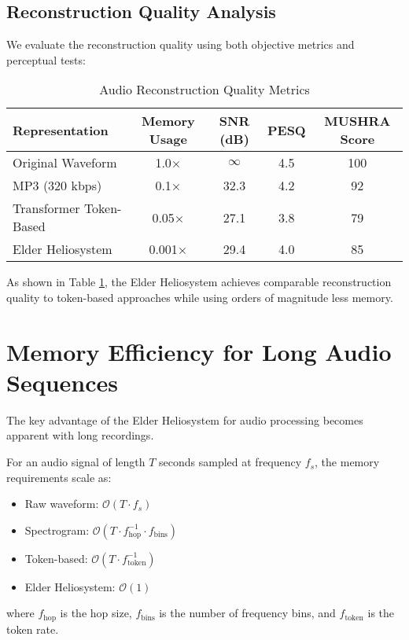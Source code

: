 \subsection{Reconstruction Quality Analysis}

We evaluate the reconstruction quality using both objective metrics and perceptual tests:

\begin{table}[ht]
\centering
\caption{Audio Reconstruction Quality Metrics}
\label{tab:reconstruction_quality}
\begin{tabular}{|l|c|c|c|c|}
\hline
\textbf{Representation} & \textbf{Memory Usage} & \textbf{SNR (dB)} & \textbf{PESQ} & \textbf{MUSHRA Score} \\
\hline
Original Waveform & 1.0× & $\infty$ & 4.5 & 100 \\
MP3 (320 kbps) & 0.1× & 32.3 & 4.2 & 92 \\
Transformer Token-Based & 0.05× & 27.1 & 3.8 & 79 \\
Elder Heliosystem & 0.001× & 29.4 & 4.0 & 85 \\
\hline
\end{tabular}
\end{table}

As shown in Table \ref{tab:reconstruction_quality}, the Elder Heliosystem achieves comparable reconstruction quality to token-based approaches while using orders of magnitude less memory.

\section{Memory Efficiency for Long Audio Sequences}

The key advantage of the Elder Heliosystem for audio processing becomes apparent with long recordings.

\begin{theorem}
For an audio signal of length $T$ seconds sampled at frequency $f_s$, the memory requirements scale as:
\begin{itemize}
    \item Raw waveform: $\mathcal{O}(T \cdot f_s)$
    \item Spectrogram: $\mathcal{O}(T \cdot f_{\text{hop}}^{-1} \cdot f_{\text{bins}})$
    \item Token-based: $\mathcal{O}(T \cdot f_{\text{token}}^{-1})$
    \item Elder Heliosystem: $\mathcal{O}(1)$
\end{itemize}
where $f_{\text{hop}}$ is the hop size, $f_{\text{bins}}$ is the number of frequency bins, and $f_{\text{token}}$ is the token rate.
\end{theorem}

